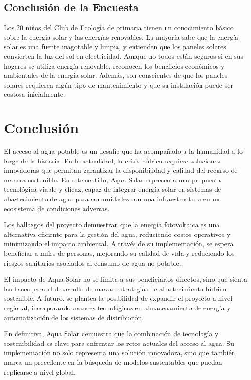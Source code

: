 \documentclass[12pt]{article}
\begin{document}
\subsection{Conclusión de la Encuesta}
Los 20 niños del Club de Ecología de primaria tienen un conocimiento básico sobre la energía solar y las energías renovables. La mayoría sabe que la energía solar es una fuente inagotable y limpia, y entienden que los paneles solares convierten la luz del sol en electricidad. Aunque no todos están seguros si en sus hogares se utiliza energía renovable, reconocen los beneficios económicos y ambientales de la energía solar. Además, son conscientes de que los paneles solares requieren algún tipo de mantenimiento y que su instalación puede ser costosa inicialmente.




\newpage
\section{Conclusión}
El acceso al agua potable es un desafío que ha acompañado a la humanidad a lo largo de la historia. En la actualidad, la crisis hídrica requiere soluciones innovadoras que permitan garantizar la disponibilidad y calidad del recurso de manera sostenible. En este sentido, Aqua Solar representa una propuesta tecnológica viable y eficaz, capaz de integrar energía solar en sistemas de abastecimiento de agua para comunidades con una infraestructura en un ecosistema de condiciones adversas.

Los hallazgos del proyecto demuestran que la energía fotovoltaica es una alternativa eficiente para la gestión del agua, reduciendo costos operativos y minimizando el impacto ambiental. A través de su implementación, se espera beneficiar a miles de personas, mejorando su calidad de vida y reduciendo los riesgos sanitarios asociados al consumo de agua no potable.

El impacto de Aqua Solar no se limita a sus beneficiarios directos, sino que sienta las bases para el desarrollo de nuevas estrategias de abastecimiento hídrico sostenible. A futuro, se plantea la posibilidad de expandir el proyecto a nivel regional, incorporando avances tecnológicos en almacenamiento de energía y automatización de los sistemas de distribución.

En definitiva, Aqua Solar demuestra que la combinación de tecnología y sostenibilidad es clave para enfrentar los retos actuales del acceso al agua. Su implementación no solo representa una solución innovadora, sino que también marca un precedente en la búsqueda de modelos sustentables que puedan replicarse a nivel global.
\end{document}
